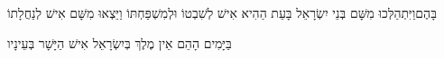 \documentclass[../main/main.tex]{subfiles}
\begin{document}
\begin{multicols*}{\ncols}
בָּהֶם\PreVerseSpace{}וַיִּתְהַלְּכוּ מִשָּׁם בְּנֵי יִשְׂרָאֵל בָּעֵת הַהִיא אִישׁ לְשִׁבְטוֹ וּלְמִשְׁפַּחְתּוֹ וַיֵּצְאוּ מִשָּׁם אִישׁ לְנַחֲלָתוֹ\OpenSection{}\par
{}בַּיָּמִים הָהֵם אֵין מֶלֶךְ בְּיִשְׂרָאֵל אִישׁ הַיָּשָׁר בְּעֵינָיו\par
\end{multicols*}
\end{document}
